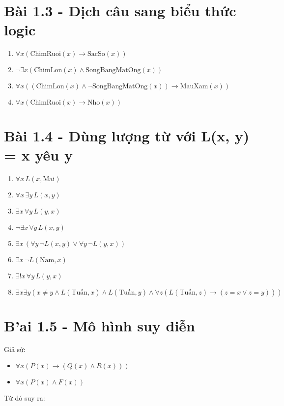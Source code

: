\documentclass[12pt]{article}
\begin{document}
\section*{Bài 1.3 - Dịch câu sang biểu thức logic}

\begin{enumerate}[label=\alph*)]
    \item $\forall x(\text{ChimRuoi}(x) \rightarrow \text{SacSo}(x))$
    \item $\neg \exists x(\text{ChimLon}(x) \land \text{SongBangMatOng}(x))$
    \item $\forall x((\text{ChimLon}(x) \land \neg \text{SongBangMatOng}(x)) \rightarrow \text{MauXam}(x))$
    \item $\forall x(\text{ChimRuoi}(x) \rightarrow \text{Nho}(x))$
\end{enumerate}

\section*{Bài 1.4 - Dùng lượng từ với L(x, y) = x yêu y}

\begin{enumerate}[label=\alph*)]
    \item $\forall x\, L(x, \text{Mai})$
    \item $\forall x\, \exists y\, L(x, y)$
    \item $\exists x\, \forall y\, L(y, x)$
    \item $\neg \exists x\, \forall y\, L(x, y)$
    \item $\exists x\, (\forall y\, \neg L(x, y) \lor \forall y\, \neg L(y, x))$
    \item $\exists x\, \neg L(\text{Nam}, x)$
    \item $\exists! x\, \forall y\, L(y, x)$
    \item $\exists x \exists y (x \neq y \land L(\text{Tuấn}, x) \land L(\text{Tuấn}, y) \land \forall z (L(\text{Tuấn}, z) \rightarrow (z = x \lor z = y)))$
\end{enumerate}

\section*{B'ai 1.5 - Mô hình suy diễn}

Giả sử:
\begin{itemize}
\item $\forall x (P(x) \rightarrow (Q(x) \land R(x)))$
\item $\forall x (P(x) \land F(x))$
\end{itemize}
Từ đó suy ra:
\end{document}
